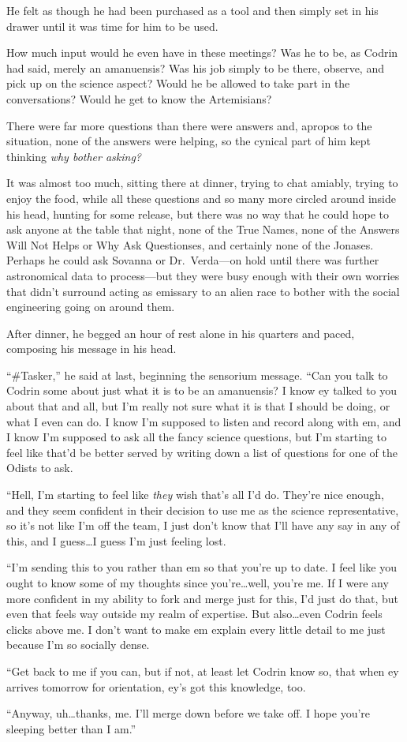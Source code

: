 He felt as though he had been purchased as a tool and then simply set in his drawer until it was time for him to be used.

How much input would he even have in these meetings? Was he to be, as Codrin had said, merely an amanuensis? Was his job simply to be there, observe, and pick up on the science aspect? Would he be allowed to take part in the conversations? Would he get to know the Artemisians?

There were far more questions than there were answers and, apropos to the situation, none of the answers were helping, so the cynical part of him kept thinking \emph{why bother asking?}

It was almost too much, sitting there at dinner, trying to chat amiably, trying to enjoy the food, while all these questions and so many more circled around inside his head, hunting for some release, but there was no way that he could hope to ask anyone at the table that night, none of the True Names, none of the Answers Will Not Helps or Why Ask Questionses, and certainly none of the Jonases. Perhaps he could ask Sovanna or Dr.~Verda—on hold until there was further astronomical data to process—but they were busy enough with their own worries that didn't surround acting as emissary to an alien race to bother with the social engineering going on around them.

After dinner, he begged an hour of rest alone in his quarters and paced, composing his message in his head.

``\#Tasker,'' he said at last, beginning the sensorium message. ``Can you talk to Codrin some about just what it is to be an amanuensis? I know ey talked to you about that and all, but I'm really not sure what it is that I should be doing, or what I even can do. I know I'm supposed to listen and record along with em, and I know I'm supposed to ask all the fancy science questions, but I'm starting to feel like that'd be better served by writing down a list of questions for one of the Odists to ask.

``Hell, I'm starting to feel like \emph{they} wish that's all I'd do. They're nice enough, and they seem confident in their decision to use me as the science representative, so it's not like I'm off the team, I just don't know that I'll have any say in any of this, and I guess\ldots I guess I'm just feeling lost.

``I'm sending this to you rather than em so that you're up to date. I feel like you ought to know some of my thoughts since you're\ldots well, you're me. If I were any more confident in my ability to fork and merge just for this, I'd just do that, but even that feels way outside my realm of expertise. But also\ldots even Codrin feels clicks above me. I don't want to make em explain every little detail to me just because I'm so socially dense.

``Get back to me if you can, but if not, at least let Codrin know so, that when ey arrives tomorrow for orientation, ey's got this knowledge, too.

``Anyway, uh\ldots thanks, me. I'll merge down before we take off. I hope you're sleeping better than I am.''
